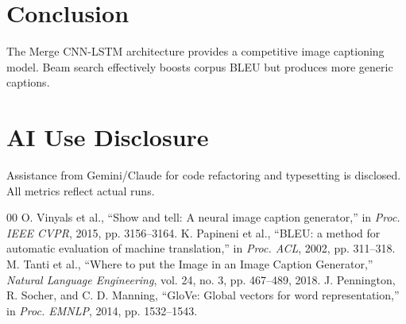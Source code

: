 \documentclass[conference]{IEEEtran}
\begin{document}
\section{Conclusion}
The Merge CNN-LSTM architecture provides a competitive image captioning model. Beam search effectively boosts corpus BLEU but produces more generic captions.

\section*{AI Use Disclosure}
Assistance from Gemini/Claude for code refactoring and typesetting is disclosed. All metrics reflect actual runs.

\begin{thebibliography}{00}
 O. Vinyals et al., ``Show and tell: A neural image caption generator,'' in \textit{Proc. IEEE CVPR}, 2015, pp. 3156--3164.
 K. Papineni et al., ``BLEU: a method for automatic evaluation of machine translation,'' in \textit{Proc. ACL}, 2002, pp. 311--318.
 M. Tanti et al., ``Where to put the Image in an Image Caption Generator,'' \textit{Natural Language Engineering}, vol. 24, no. 3, pp. 467--489, 2018.
 J. Pennington, R. Socher, and C. D. Manning, ``GloVe: Global vectors for word representation,'' in \textit{Proc. EMNLP}, 2014, pp. 1532--1543.
\end{thebibliography}
\end{document}
